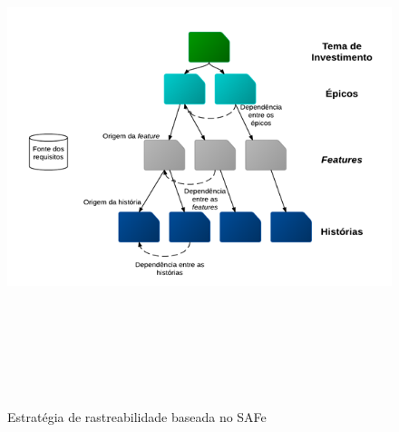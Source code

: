\begin{figure}[!htb]
 \centering
 \includegraphics[width = 18cm, height = 15cm]{rastreabilidade}
 \caption{Estratégia de rastreabilidade baseada no SAFe \cite{safe}}
 \label{fig:rastreabilidade}

\end{figure}